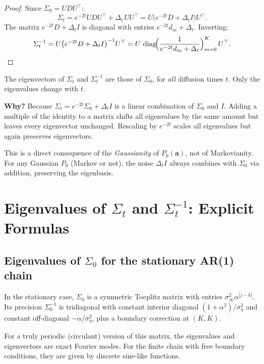 \documentclass[11pt,a4paper]{article}
\newcommand{\diag}{\operatorname{diag}}
\newcommand{\Dt}{\Delta_t}
\newcommand{\sigeta}{\sigma_\eta^2}
\newcommand{\siginf}{\sigma_\infty^2}
\begin{document}
\begin{proof}
Since $\Sigma_0 = UDU^\top$:
\[
  \Sigma_t = e^{-2t}UDU^\top + \Dt\,UU^\top = U\bigl(e^{-2t}D + \Dt I\bigr)U^\top.
\]
The matrix $e^{-2t}D + \Dt I$ is diagonal with entries $e^{-2t}d_m + \Dt$.  Inverting:
\[
  \Sigma_t^{-1} = U\bigl(e^{-2t}D + \Dt I\bigr)^{-1}U^\top = U\,\diag\!\Bigl(\frac{1}{e^{-2t}d_m + \Dt}\Bigr)_{m=0}^K\,U^\top. \qedhere
\]
\end{proof}

\begin{keyresult}
The eigenvectors of $\Sigma_t$ and $\Sigma_t^{-1}$ are those of $\Sigma_0$, for \emph{all} diffusion times $t$.  Only the eigenvalues change with $t$.

\medskip
\textbf{Why?}  Because $\Sigma_t = e^{-2t}\Sigma_0 + \Dt I$ is a linear combination of $\Sigma_0$ and $I$.  Adding a multiple of the identity to a matrix shifts all eigenvalues by the same amount but leaves every eigenvector unchanged.  Rescaling by $e^{-2t}$ scales all eigenvalues but again preserves eigenvectors.

\medskip
This is a direct consequence of the \emph{Gaussianity} of $P_0(\mathbf{a})$, not of Markovianity.  For any Gaussian $P_0$ (Markov or not), the noise $\Dt I$ always combines with $\Sigma_0$ via addition, preserving the eigenbasis.
\end{keyresult}

\section{Eigenvalues of $\Sigma_t$ and $\Sigma_t^{-1}$: Explicit Formulas}
\label{sec:eigenvalues}

\subsection{Eigenvalues of $\Sigma_0$ for the stationary AR(1) chain}

In the stationary case, $\Sigma_0$ is a symmetric Toeplitz matrix with entries $\siginf \alpha^{|j-k|}$.  Its precision $\Sigma_0^{-1}$ is tridiagonal with constant interior diagonal $(1+\alpha^2)/\sigeta$ and constant off-diagonal $-\alpha/\sigeta$, plus a boundary correction at $(K,K)$.

For a truly periodic (circulant) version of this matrix, the eigenvalues and eigenvectors are exact Fourier modes.  For the finite chain with free boundary conditions, they are given by discrete sine-like functions.
\end{document}

